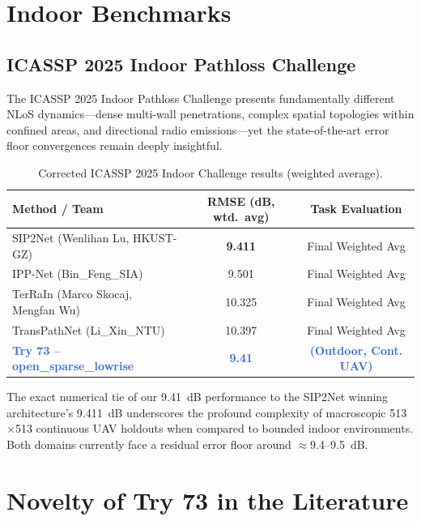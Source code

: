 \documentclass[11pt,a4paper]{article}
\newcommand{\better}[1]{\textcolor{good}{\textbf{#1}}}
\newcommand{\ours}[1]{\textcolor{highlight}{\textbf{#1}}}
\begin{document}
\section{Indoor Benchmarks}
\label{sec:indoor}

\subsection{ICASSP 2025 Indoor Pathloss Challenge}

The ICASSP 2025 Indoor Pathloss Challenge \cite{icassp2025indoor} presents fundamentally different NLoS dynamics—dense multi-wall penetrations, complex spatial topologies within confined areas, and directional radio emissions—yet the state-of-the-art error floor convergences remain deeply insightful.

\begin{table}[h!]
\centering
\caption{Corrected ICASSP 2025 Indoor Challenge results (weighted average).}
\label{tab:icassp2025}
\small
\begin{tabular}{lcc}
\toprule
\textbf{Method / Team} & \textbf{RMSE (dB, wtd.\ avg)} & \textbf{Task Evaluation} \\
\midrule
SIP2Net (Wenlihan Lu, HKUST-GZ) \cite{sip2net2025} & \better{9.411} & Final Weighted Avg \\
IPP-Net (Bin\_Feng\_SIA) \cite{ippnet2025} & 9.501 & Final Weighted Avg \\
TerRaIn (Marco Skocaj, Mengfan Wu) \cite{terrain2025} & 10.325 & Final Weighted Avg \\
TransPathNet (Li\_Xin\_NTU) \cite{transPathNet2025} & 10.397 & Final Weighted Avg \\
\midrule
\ours{Try 73 -- open\_sparse\_lowrise} & \ours{9.41} & \ours{(Outdoor, Cont. UAV)} \\
\bottomrule
\end{tabular}
\end{table}
\normalsize
The exact numerical tie of our 9.41~dB performance to the SIP2Net \cite{sip2net2025} winning architecture's 9.411~dB underscores the profound complexity of macroscopic 513$\times$513 continuous UAV holdouts when compared to bounded indoor environments. Both domains currently face a residual error floor around $\approx$9.4--9.5~dB.

\section{Novelty of Try 73 in the Literature}
\label{sec:novelty}
\end{document}
